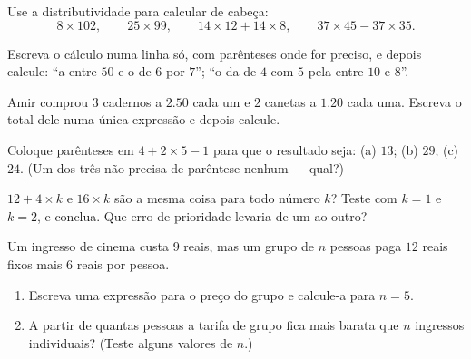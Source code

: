 \begin{exercise}[$\star$]\label{exo:g7:priorities:5}
Use a distributividade para calcular de cabeça:
\[
8 \times 102, \qquad
25 \times 99, \qquad
14 \times 12 + 14 \times 8, \qquad
37 \times 45 - 37 \times 35 .
\]
\end{exercise}

\begin{exercise}[$\star$]\label{exo:g7:priorities:6}
Escreva o cálculo numa linha só, com parênteses onde for preciso, e
depois calcule: ``a  entre $50$ e o  de $6$ por $7$'';
``o  da  de $4$ com $5$ pela  entre $10$ e $8$''.
\end{exercise}

\begin{exercise}[$\star$]\label{exo:g7:priorities:7}
Amir comprou $3$ cadernos a $2.50$ cada um e $2$ canetas a $1.20$ cada
uma. Escreva o total dele numa única expressão e depois calcule.
\end{exercise}

\begin{exercise}[$\star\star$]\label{exo:g7:priorities:8}
Coloque parênteses em $4 + 2 \times 5 - 1$ para que o resultado seja:
(a) $13$; (b) $29$; (c) $24$. (Um dos três não precisa de parêntese
nenhum --- qual?)
\end{exercise}

\begin{exercise}[$\star\star$]\label{exo:g7:priorities:9}
$12 + 4 \times k$ e $16 \times k$ são a mesma coisa para todo número
$k$? Teste com $k = 1$ e $k = 2$, e conclua. Que erro de prioridade
levaria de um ao outro?
\end{exercise}

\begin{exercise}[$\star\star$]\label{exo:g7:priorities:10}
Um ingresso de cinema custa $9$ reais, mas um grupo de $n$ pessoas paga
$12$ reais fixos mais $6$ reais por pessoa.
\begin{enumerate}
  \item Escreva uma expressão para o preço do grupo e calcule-a para
        $n = 5$.
  \item A partir de quantas pessoas a tarifa de grupo fica mais barata
        que $n$ ingressos individuais? (Teste alguns valores de $n$.)
\end{enumerate}
\end{exercise}

